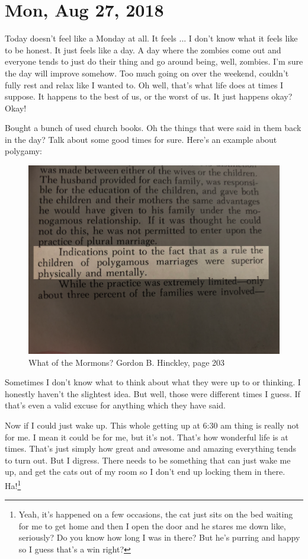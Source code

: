 \section{Mon, Aug 27, 2018}

Today doesn't feel like a Monday at all. It feels ... I don't know what it feels
like to be honest. It just feels like a day. A day where the zombies come out and
everyone tends to just do their thing and go around being, well, zombies. I'm sure
the day will improve somehow. Too much going on over the weekend, couldn't fully rest
and relax like I wanted to. Oh well, that's what life does at times I suppose. It
happens to the best of us, or the worst of us. It just happens okay? Okay!

Bought a bunch of used church books. Oh the things that were said in them back in the
day? Talk about some good times for sure. Here's an example about polygamy:

\begin{figure}[h!]
  \centering
  \includegraphics[width=1\linewidth]{2018/images/polygamy.png}
  \caption{What of the Mormons? Gordon B. Hinckley, page 203}
  \label{fig:polygamy}
\end{figure}

Sometimes I don't know what to think about what they were up to or thinking. I
honestly haven't the slightest idea. But well, those were different times I guess. If
that's even a valid excuse for anything which they have said.

Now if I could just wake up. This whole getting up at 6:30 am thing is really not for
me. I mean it could be for me, but it's not. That's how wonderful life is at times.
That's just simply how great and awesome and amazing everything tends to turn out.
But I digress. There needs to be something that can just wake me up, and get the cats
out of my room so I don't end up locking them in there. Ha!\footnote{Yeah, it's 
happened on a few occasions, the cat just sits on the bed waiting for me to get home
and then I open the door and he stares me down like, seriously? Do you know how long
I was in there? But he's purring and happy so I guess that's a win right?}

